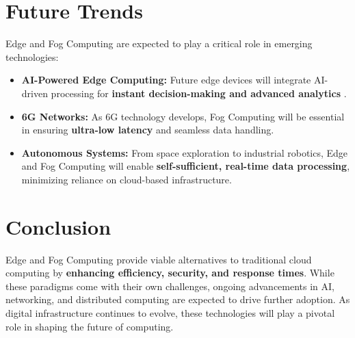 \documentclass[conference]{IEEEtran}
\begin{document}
	\section{Future Trends}
	Edge and Fog Computing are expected to play a critical role in emerging technologies:
	\begin{itemize}
		\item \textbf{AI-Powered Edge Computing:} Future edge devices will integrate AI-driven processing for \textbf{instant decision-making and advanced analytics} \cite{chiang2017fog}.
		\item \textbf{6G Networks:} As 6G technology develops, Fog Computing will be essential in ensuring \textbf{ultra-low latency} and seamless data handling.
		\item \textbf{Autonomous Systems:} From space exploration to industrial robotics, Edge and Fog Computing will enable \textbf{self-sufficient, real-time data processing}, minimizing reliance on cloud-based infrastructure.
	\end{itemize}
	
	\section{Conclusion}
	Edge and Fog Computing provide viable alternatives to traditional cloud computing by \textbf{enhancing efficiency, security, and response times}. While these paradigms come with their own challenges, ongoing advancements in AI, networking, and distributed computing are expected to drive further adoption. As digital infrastructure continues to evolve, these technologies will play a pivotal role in shaping the future of computing.
	
	
	
	
\end{document}
